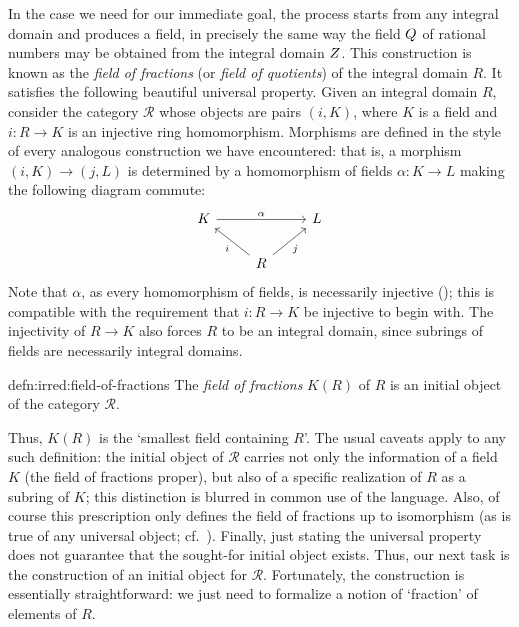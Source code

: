 In the case we need for our immediate goal, the process starts from
any integral domain and produces a field, in precisely the same way
the field $Q$ of rational numbers may be obtained from the integral
domain $Z$. This construction is known as the \emph{field of
  fractions} (or \emph{field of quotients}) of the integral domain
$R$. It satisfies the following beautiful universal property.  Given
an integral domain $R$, consider the category $\mathscr{R}$ whose
objects are pairs $(i, K)$, where $K$ is a field and $i : R \to K$ is
an injective ring homomorphism. Morphisms are defined in the style of
every analogous construction we have encountered: that is, a morphism
$(i, K) \to (j, L)$ is determined by a homomorphism of fields
$\alpha : K \to L$ making the following diagram commute:
\[\begin{tikzcd}
    K \arrow[rr, "\alpha"] & & L \\
    & R \arrow[ul, "i"] \arrow[ur, "j"']
  \end{tikzcd}\] Note that $\alpha$, as every homomorphism of fields,
is necessarily injective (); this
is compatible with the requirement that $i : R \to K$ be injective to
begin with. The injectivity of $R \to K$ also forces $R$ to be an
integral domain, since subrings of fields are necessarily integral
domains.
\begin{defn}{}{defn:irred:field-of-fractions}
  The \emph{field of fractions} $K(R)$ of $R$ is an initial object of
  the category $\mathscr{R}$.
\end{defn}

Thus, $K(R)$ is the `smallest field containing $R$'.  The usual
caveats apply to any such definition: the initial object of
$\mathscr{R}$ carries not only the information of a field $K$ (the
field of fractions proper), but also of a specific realization of $R$
as a subring of $K$; this distinction is blurred in common use of the
language. Also, of course this prescription only defines the field of
fractions up to isomorphism (as is true of any universal object; cf.\
). Finally, just stating the
universal property does not guarantee that the sought-for initial
object exists. Thus, our next task is the construction of an initial
object for $\mathscr{R}$.  Fortunately, the construction is
essentially straightforward: we just need to formalize a notion of
`fraction' of elements of $R$.

